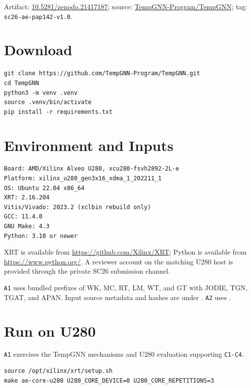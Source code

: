 \documentclass[conference]{IEEEtran}
\begin{document}
\noindent Artifact:
\href{https://doi.org/10.5281/zenodo.21417187}{10.5281/zenodo.21417187};
source:
\href{https://github.com/TempGNN-Program/TempGNN}{TempGNN-Program/TempGNN};
tag: \texttt{sc26-ae-pap142-v1.0}.

\section{Download}

\begin{Verbatim}[fontsize=\small,breaklines=true,breakanywhere=true]
git clone https://github.com/TempGNN-Program/TempGNN.git
cd TempGNN
python3 -m venv .venv
source .venv/bin/activate
pip install -r requirements.txt
\end{Verbatim}

\section{Environment and Inputs}

\begin{Verbatim}[fontsize=\small,breaklines=true,breakanywhere=true]
Board: AMD/Xilinx Alveo U280, xcu280-fsvh2892-2L-e
Platform: xilinx_u280_gen3x16_xdma_1_202211_1
OS: Ubuntu 22.04 x86_64
XRT: 2.16.204
Vitis/Vivado: 2023.2 (xclbin rebuild only)
GCC: 11.4.0
GNU Make: 4.3
Python: 3.10 or newer
\end{Verbatim}

XRT is available from \url{https://github.com/Xilinx/XRT}; Python is available
from \url{https://www.python.org/}. A reviewer account on the matching U280
host is provided through the private SC26 submission channel.

\texttt{A1} uses bundled prefixes of WK, MC, RT, LM, WT, and GT with JODIE,
TGN, TGAT, and APAN. Input source metadata and hashes are under
. \texttt{A2} uses
.

\section{Run on U280}

\texttt{A1} exercises the TempGNN mechanisms and U280 evaluation supporting
\texttt{C1-C4}.

\begin{Verbatim}[fontsize=\small,breaklines=true,breakanywhere=true]
source /opt/xilinx/xrt/setup.sh
make ae-core-u280 U280_CORE_DEVICE=0 U280_CORE_REPETITIONS=3
\end{Verbatim}
\end{document}
